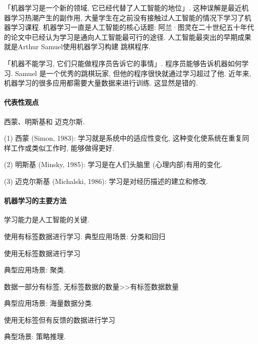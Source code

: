 「机器学习是一个新的领域, 它已经代替了人工智能的地位」. 这种误解是最近机器学习热潮产生的副作用, 大量学生在之前没有接触过人工智能的情况下学习了机器学习课程. 机器学习一直是人工智能的核心话题: 阿兰·图灵在二十世纪五十年代的论文中已经认为学习是通向人工智能最可行的途径. 人工智能最突出的早期成果就是Arthur Samuel使用机器学习构建 跳棋程序.

「机器不能学习, 它们只能做程序员告诉它的事情」. 程序员能够告诉机器如何学习. Samuel 是一个优秀的跳棋玩家, 但他的程序很快就通过学习超过了他. 近年来, 机器学习的很多应用都需要大量数据来进行训练. 这显然是错的.
\paragraph{代表性观点} 西蒙、明斯基和 迈克尔斯.

 (1) 西蒙 (Simon, 1983): 学习就是系统中的适应性变化, 这种变化使系统在重复同样工作或类似工作时, 能够做得更好.

 (2) 明斯基 (Minsky, 1985): 学习是在人们头脑里 (心理内部)有用的变化.

 (3) 迈克尔斯基 (Michalski, 1986): 学习是对经历描述的建立和修改.

\paragraph{机器学习的主要方法}
学习能力是人工智能的关键.
\begin{tcolorbox}[colback=white!50,colframe=orange!50,title=监督学习 ( Supervised learning)]
    使用有标签数据进行学习. 典型应用场景: 分类和回归
\end{tcolorbox}

\begin{tcolorbox}[colback=white!50,colframe=orange!50,title=非监督学习 ( Unsupervised learning)]
使用无标签数据进行学习

典型应用场景: 聚类.
\end{tcolorbox}

\begin{tcolorbox}[colback=white!50,colframe=orange!50,title=半监督学习 ( Semi-supervised learning)]
数据一部分有标签, 无标签数据的数量>>有标签数据数量

典型应用场景: 海量数据分类.
\end{tcolorbox}

\begin{tcolorbox}[colback=white!50,colframe=orange!50,title=强化学习 ( Reinforcement learning)]
使用无标签但有反馈的数据进行学习

典型场景: 策略推理.
\end{tcolorbox}


